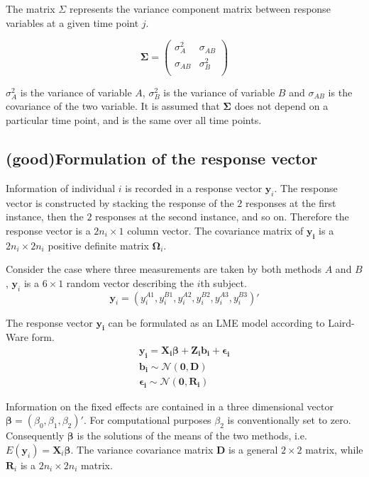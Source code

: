 \documentclass[12pt, a4paper]{report}
\theoremstyle{plain}
\theoremstyle{definition}
\theoremstyle{remark}
\begin{document}
		The matrix $\Sigma$ represents the variance component matrix between response variables at a given time point $j$.
		
		\[
		\boldsymbol{\Sigma} = \left( \begin{array}{cc}
		\sigma^2_{A} & \sigma_{AB} \\
		\sigma_{AB} & \sigma^2_{B}\\
		\end{array}   \right)
		\]
		
		$\sigma^2_{A}$ is the variance of variable $A$, $\sigma^2_{B}$ is the variance of variable $B$ and $\sigma_{AB}$ is the covariance of the two variable. It is assumed that $\boldsymbol{\Sigma}$ does not depend on a particular time point, and is the same over all time points.
		

		\subsection{ (good)Formulation of the response vector}
		Information of individual $i$ is recorded in a response vector $\boldsymbol{y}_{i}$. The response vector is constructed by stacking the response of the $2$ responses at the first instance, then the $2$ responses at the second instance, and so on. Therefore the response vector is a $2n_{i} \times 1$ column vector.
		The covariance matrix of $\boldsymbol{y_{i}}$ is a $2n_{i} \times 2n_{i}$ positive definite matrix $\boldsymbol{\Omega}_{i}$.
		
		Consider the case where three measurements are taken by both methods $A$ and $B$, $\boldsymbol{y}_{i}$ is a $6 \times 1$ random vector describing the $i$th subject.
		\[
		\boldsymbol{y}_{i} = (y_{i}^{A1},y_{i}^{B1},y_{i}^{A2},y_{i}^{B2},y_{i}^{A3},y_{i}^{B3}) \prime
		\]
		
		The response vector $\boldsymbol{y_{i}}$ can be formulated as an LME model according to Laird-Ware form.
		\begin{eqnarray*}
			\boldsymbol{y_{i}} = \boldsymbol{X_{i}\beta}  + \boldsymbol{Z_{i}b_{i}} + \boldsymbol{\epsilon_{i}}\\
			\boldsymbol{b_{i}} \sim \mathcal{N}(\boldsymbol{0,D})\\
			\boldsymbol{\epsilon_{i}} \sim \mathcal{N}(\boldsymbol{0,R_{i}})
		\end{eqnarray*}
		
		Information on the fixed effects are contained in a three dimensional vector $\boldsymbol{\beta} = (\beta_{0},\beta_{1},\beta_{2})\prime$. For computational purposes $\beta_{2}$ is conventionally set to zero. Consequently $\boldsymbol{\beta}$ is the solutions of the means of the two methods, i.e. $E(\boldsymbol{y}_{i})  = \boldsymbol{X}_{i}\boldsymbol{\beta}$. The variance covariance matrix $\boldsymbol{D}$ is a general $2 \times 2$ matrix, while $\boldsymbol{R}_{i}$ is a $2n_{i} \times 2n_{i}$ matrix.
		
\end{document}
